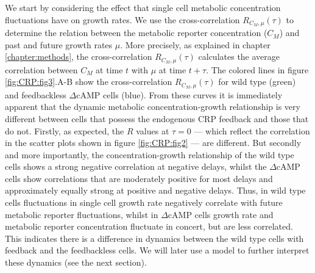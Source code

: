 %
We start by considering the effect that single cell metabolic concentration fluctuations have on growth rates.
%
We use the 
cross-correlation $R_{C_M,\mu}(\tau)$ to determine the relation between the metabolic reporter concentration ($C_M$) and past and future growth rates $\mu$.
%
More precisely, as explained in chapter \ref{chapter:methods}, the cross-correlation $R_{C_M,\mu}(\tau)$ calculates the average correlation between $C_M$ at time $t$ with $\mu$ at time $t+\tau$.
%
The colored lines in figure \ref{fig:CRP:fig3}.A-B show the cross-correlation $R_{C_M,\mu}(\tau)$ for wild type (green) and feedbackless $\Delta$cAMP cells (blue).
%
%
From these curves it is immediately apparent that the dynamic metabolic concentration-growth relationship is very different between cells 
that possess the endogenous CRP feedback and those that do not.
%
Firstly, as expected, the $R$ values at $\tau=0$ --- which reflect the correlation in the scatter plots shown in figure \ref{fig:CRP:fig2} --- are different.
But secondly and more importantly, 
%
the concentration-growth relationship of the wild type cells shows a strong negative correlation at negative delays, 
whilst the $\Delta$cAMP cells show 
correlations that are moderately positive for most delays and 
approximately equally strong at positive and negative delays. 
%
%
Thus, in wild type cells fluctuations in single cell growth rate negatively correlate with future metabolic reporter fluctuations, 
whilst in $\Delta$cAMP cells growth rate and metabolic reporter concentration fluctuate in concert, but are less correlated.
%
This indicates there is a difference in dynamics between the wild type cells with feedback and the feedbackless cells.
%
We will later use a model to further interpret these dynamics (see the next section).



